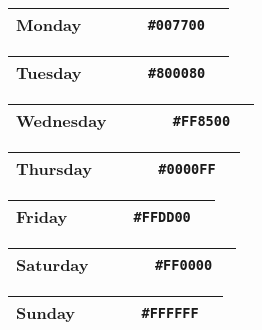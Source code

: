\begin{table}[!htbp]
	\begin{tabularx}{\textwidth}{X r c r c}
		Monday 
		& ~ & ~
		& \texttt{\#007700} & \cellcolor[HTML]{007700}\phantom{--} \\ \hline
	\end{tabularx}
\end{table}

\begin{table}[!htbp]
	\begin{tabularx}{\textwidth}{X r c r c}
		Tuesday 
		& ~ & ~
		& \texttt{\#800080} & \cellcolor[HTML]{800080}\phantom{--} \\ \hline
	\end{tabularx}
\end{table}

\begin{table}[!htbp]
	\begin{tabularx}{\textwidth}{X r c r c}
		Wednesday 
		& ~ & ~
		& \texttt{\#FF8500} & \cellcolor[HTML]{FF8500}\phantom{--} \\ \hline
	\end{tabularx}
\end{table}

\begin{table}[!htbp]
	\begin{tabularx}{\textwidth}{X r c r c}
		Thursday 
		& ~ & ~
		& \texttt{\#0000FF} & \cellcolor[HTML]{0000FF}\phantom{--} \\ \hline
	\end{tabularx}
\end{table}

\begin{table}[!htbp]
	\begin{tabularx}{\textwidth}{X r c r c}
		Friday 
		& ~ & ~
		& \texttt{\#FFDD00} & \cellcolor[HTML]{FFDD00}\phantom{--} \\ \hline
	\end{tabularx}
\end{table}

\begin{table}[!htbp]
	\begin{tabularx}{\textwidth}{X r c r c}
		Saturday 
		& ~ & ~
		& \texttt{\#FF0000} & \cellcolor[HTML]{FF0000}\phantom{--} \\ \hline
	\end{tabularx}
\end{table}

\begin{table}[!htbp]
	\begin{tabularx}{\textwidth}{X r c r c}
		Sunday 
		& ~ & ~
		& \texttt{\#FFFFFF} & \cellcolor[HTML]{FFFFFF}\phantom{--} \\ \hline
	\end{tabularx}
\end{table}

